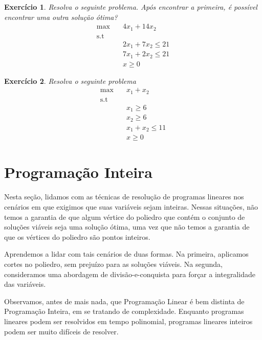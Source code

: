 \documentclass[]{article}
\newtheorem{exercicio}{Exercício}
\numberwithin{equation}{section}
\begin{document}
\begin{exercicio}
  Resolva o seguinte problema.
  Após encontrar a primeira, é possível encontrar uma outra solução ótima?
  \begin{align}
  \max        &\quad 4x_1 + 14x_2         \\
  \text{s.t}  &\quad                      \\
              &\quad 2x_1 +  7x_2 \leq 21 \\
              &\quad 7x_1 +  2x_2 \leq 21 \\
              &\quad x            \geq 0
  \end{align}
\end{exercicio}

\begin{exercicio}
  Resolva o seguinte problema
  \begin{align}
  \max        &\quad x_1 + x_2         \\
  \text{s.t}  &\quad                   \\
              &\quad x_1       \geq 6  \\
              &\quad       x_2 \geq 6  \\
              &\quad x_1 + x_2 \leq 11 \\
              &\quad x         \geq 0
  \end{align}
\end{exercicio}

\section{Programação Inteira}

Nesta seção, lidamos com as técnicas de resolução de programas lineares nos cenários em que exigimos que
suas variáveis sejam inteiras.
Nessas situações, não temos a garantia de que algum vértice do poliedro que contém o conjunto de
soluções viáveis seja uma solução ótima, uma vez que não temos a garantia de que os vértices do poliedro
são pontos inteiros.

Aprendemos a lidar com tais cenários de duas formas. Na primeira, aplicamos cortes no poliedro, sem
prejuízo para as soluções viáveis. Na segunda, consideramos uma abordagem de divisão-e-conquista para
forçar a integralidade das variáveis.

Observamos, antes de mais nada, que Programação Linear é bem distinta de Programação Inteira, em se
tratando de complexidade.
Enquanto programas lineares podem ser resolvidos em tempo polinomial, programas lineares inteiros podem
ser muito difíceis de resolver.
\end{document}
